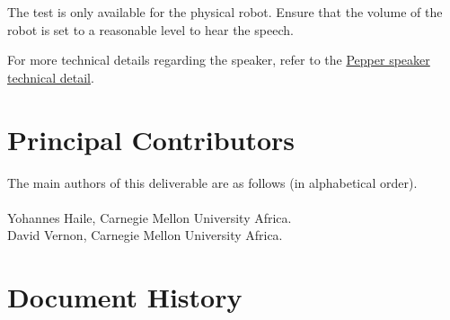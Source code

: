 \documentclass{CSSRforAfrica}
\newcommand{\blank}{~\\}
\begin{document}
\vspace{0.5cm}

\begingroup
{}
\begin{tcolorbox}[nobeforeafter,
    enhanced,
    sharp corners,
    toprule=1pt,
    bottomrule=1pt,
    leftrule=0pt,
    rightrule=0pt,
    colback=yellow!20,
    left skip=\mynote@shift,
    right skip=\mynote@shift,
    overlay={\node[left] (mynotenode) at ([xshift=-\mynote@shift]frame.west) {\textbf{\textcolor{greenyellow}{Note:}}} ;},]
    The test is only available for the physical robot. Ensure that the volume of the robot is set to a reasonable level to hear the speech.
\end{tcolorbox}

For more technical details regarding the speaker, refer to the \href{http://doc.aldebaran.com/2-5/family/pepper_technical/speaker_pep.html#d-speaker-pepper}{Pepper speaker technical detail}.


\newpage


\pagebreak
\section*{Principal Contributors}
\label{contributors}
The main authors of this deliverable are as follows (in alphabetical order).
\blank
~
\blank
Yohannes Haile, Carnegie Mellon University Africa.\\    %
David Vernon, Carnegie Mellon University Africa. \\                                                                           %
 

  
\newpage
\section*{Document History}
\label{document_history}
\end{document}
